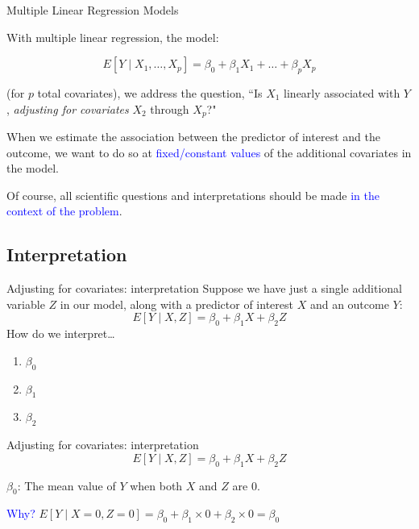 \documentclass[10pt,t]{beamer}
\begin{document}
\begin{frame}{Multiple Linear Regression Models}
	\vspace{-5 mm}

	With multiple linear regression, the model:
	
	\[E[Y \mid X_1, \dots, X_p] = \beta_0 + \beta_1 X_1 + \dots + \beta_p X_p\]
	
	(for $p$ total covariates), we address the question, ``Is $X_1$ linearly associated with $Y$, \textit{adjusting for covariates} $X_2$ through $X_p$?" 
	
	\vspace{0.3cm}
	
	When we estimate the association between the predictor of interest and the outcome, we want to do so at \textcolor{blue}{fixed/constant values} of the additional covariates in the model. 
	
	\vspace{0.3cm}
	
	
	
	Of course, all scientific questions and interpretations should be made \textcolor{blue}{in the context of the problem}. 
\end{frame}


\subsection{Interpretation}

\begin{frame}{Adjusting for covariates: interpretation}
Suppose we have just a single additional variable $Z$ in our model, along with a predictor of interest $X$ and an outcome $Y$:
$$
E[Y \mid X, Z] = \beta_0 + \beta_1 X + \beta_2 Z
$$\pause
How do we interpret\dots
\vspace{0.3cm}
\begin{enumerate}
	\item[] $\beta_0$
	\item[] $\beta_1$
	\item[] $\beta_2$
\end{enumerate}
\end{frame}

\begin{frame}{Adjusting for covariates: interpretation}
$$
E[Y \mid X, Z] = \beta_0 + \beta_1 X + \beta_2 Z
$$

\vspace{0.3cm}

$\beta_0$: The mean value of $Y$ when both $X$ and $Z$ are 0.

\vspace{0.3cm}

\textcolor{blue}{Why?} \pause $E[Y \mid X = 0, Z = 0] = \beta_0 + \beta_1 \times 0 + \beta_2 \times 0 = \beta_0$
\end{frame}
\end{document}
